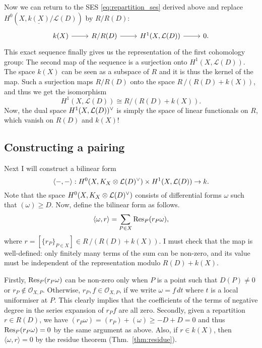 Now we can return to the SES \eqref{eq:repartition_ses} derived above and
replace $H^{0}(X,\underline{k(X)}/\mathcal{L}(D))$ by $R/R(D)$:
\[
  \begin{tikzcd}
    k(X)\rar & R/R(D)\rar & H^{1}(X,\mathcal{L}(D))\rar & 0.
  \end{tikzcd}
\]
This exact sequence finally gives us the representation of the first
cohomology group: The second map of the sequence is a surjection
onto $H^{1}(X,\mathcal{L}(D))$. The space $k(X)$ can be seen as a subspace
of $R$ and it is thus the kernel of the map. Such a surjection maps $R/R(D)$
onto the space $R\,/\left(R(D)+k(X)\right)$, and thus we get the isomorphism
\[H^{1}(X,\mathcal{L}(D))\cong R/\left(R(D)+k(X)\right).\]
Now, the dual space $H^1(X,\mathcal{L}(D))^{\vee}$ is simply the space
of linear functionals on $R$, which vanish on $R(D)$ and $k(X)$!

\subsection{Constructing a pairing}
Next I will construct a bilinear form
\[
  \langle -,-\rangle:H^0(X,K_X\otimes\mathcal{L}(D)^{\vee})\times H^{1}(X,\mathcal{L}(D))\to k.
\]
Note that the space $H^0(X,K_X\otimes\mathcal{L}(D)^{\vee})$ consists of differential forms $\omega$
such that $(\omega)\geq D$.
Now, define the bilinear form as follows.
\[
  \langle\omega,r\rangle=\sum_{P\in X}\operatorname{Res}_{P}(r_{P}\omega),
\]
where $r=[\{r_{P}\}_{P\in X}]\in R\,/\left(R(D)+k(X)\right)$. I must check
that the map is well-defined: only finitely many terms of the sum can be
non-zero, and its value must be independent of the representation modulo
$R(D)+k(X)$.

Firstly, $\operatorname{Res}_{P}(r_{P}\omega)$ can be non-zero only when $P$ is a point
such that $D(P)\neq 0$ or $r_{P}\not\in\mathscr{O}_{X,P}$. Otherwise,
$r_{P},f\in\mathscr{O}_{X,P}$, if we write $\omega=f\,dt$ where $t$ is a
local uniformiser at $P$. This clearly implies that the coefficients of the
terms of negative degree in the series expansion of $r_{P}f$ are all zero.
Secondly, given a repartition $r\in R(D)$, we have $(r_{P}\omega)
=(r_{P})+(\omega) \geq -D+D=0$ and thus $\operatorname{Res}_{P}(r_{P}\omega)=0$ by the same
argument as above. Also, if $r\in k(X)$, then $\langle \omega,r\rangle=0$ by
the residue theorem (Thm.~\ref{thm:residue}).

